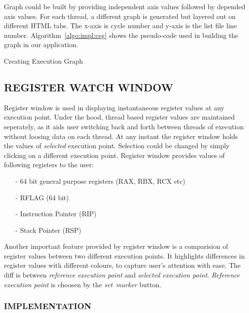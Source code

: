 Graph could be built by providing independent axis values followed by depended axis values. For each thread, a different graph is generated but layered out on different HTML tabs. The x-axis is cycle number and y-axis is the list file line number. Algorithm~\ref{algo:impl:ceg} shows the pseudo-code used in building the graph in our application.

\IncMargin{1em}
\begin{algorithm}[h]
\DontPrintSemicolon
{} 
\KwFn{}
\BlankLine
{}
\caption{Creating Execution Graph}
\label{algo:impl:ceg}
\end{algorithm}\DecMargin{1em}

\subsection {REGISTER WATCH WINDOW}
\label{sec:impl:rww}
Register window is used in displaying instantaneous register values at any execution point. Under the hood, thread based register values are maintained seperately, as it aids user switching back and forth between threads of execution without loosing data on each thread. At any instant the register window holds the values of {\it selected} execution point. Selection could be changed by simply clicking on a different execution point. Register window provides values of following registers to the user:
\begin{itemize}
	\item[-] 64 bit general purpose registers (RAX, RBX, RCX etc)
	\item[-] RFLAG (64 bit)
	\item[-] Instruction Pointer (RIP)
	\item[-] Stack Pointer (RSP)
\end{itemize}

Another important feature provided by register window is a comparision of register values between two different execution points. It highlights differences in register values with different colours, to capture user's attention with ease. The diff is between {\it reference execution point} and {\it selected execution point}. {\it Reference execution point} is choosen by the {\it set~marker} button.

\subsubsection{IMPLEMENTATION}

